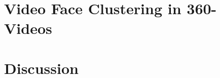  
\section{Video Face Clustering in 360-Videos}
\label{sec:authoring_clustering_360}

\section{Discussion}
\label{sec:authoring_discussion}